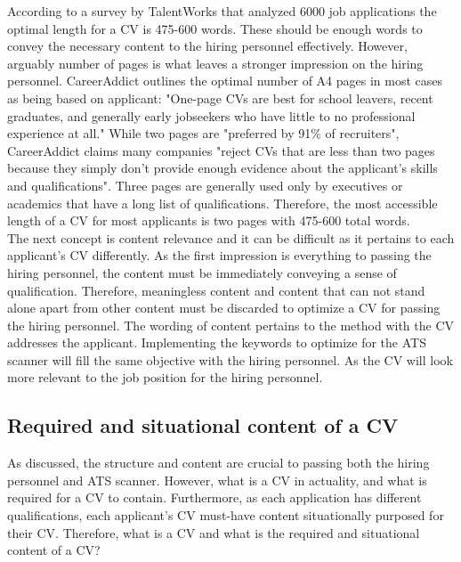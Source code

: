 According to a survey by TalentWorks that analyzed 6000 job applications the optimal length for a CV is 475-600 words.\cite{CV_Word_length}
These should be enough words to convey the necessary content to the hiring personnel effectively. 
However, arguably number of pages is what leaves a stronger impression on the hiring personnel.
CareerAddict outlines the optimal number of A4 pages in most cases as being based on applicant:\cite{CV_Page_length}
"One-page CVs are best for school leavers, recent graduates, and generally early jobseekers who have little to no professional experience at all."\cite{CV_Page_length}
While two pages are "preferred by 91\% of recruiters", CareerAddict claims many companies "reject CVs that are less than two pages because they simply don’t provide enough evidence about the applicant’s skills and qualifications".\cite{CV_Page_length}
Three pages are generally used only by executives or academics that have a long list of qualifications.
Therefore, the most accessible length of a CV for most applicants is two pages with 475-600 total words. \\

The next concept is content relevance and it can be difficult as it pertains to each applicant's CV differently.
As the first impression is everything to passing the hiring personnel, the content must be immediately conveying a sense of qualification.
Therefore, meaningless content and content that can not stand alone apart from other content must be discarded to optimize a CV for passing the hiring personnel.
The wording of content pertains to the method with the CV addresses the applicant.
Implementing the keywords to optimize for the ATS scanner will fill the same objective with the hiring personnel.
As the CV will look more relevant to the job position for the hiring personnel.\\

\subsection{Required and situational content of a CV}
As discussed, the structure and content are crucial to passing both the hiring personnel and ATS scanner.
However, what is a CV in actuality, and what is required for a CV to contain.
Furthermore, as each application has different qualifications, each applicant's CV must-have content situationally purposed for their CV.
Therefore, what is a CV and what is the required and situational content of a CV? \\

